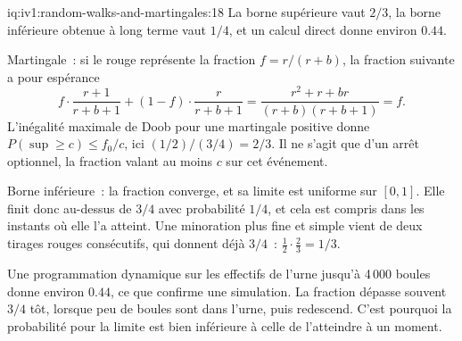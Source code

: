 \begin{solution}{iq:iv1:random-walks-and-martingales:18}
La borne supérieure vaut $2/3$, la borne inférieure obtenue à long terme vaut $1/4$, et un calcul direct donne environ $0.44$.

\begin{sloppypar}Martingale~: si le rouge représente la fraction $f = r/(r + b)$, la fraction suivante a pour espérance
\[
f \cdot \frac{r + 1}{r + b + 1} + (1 - f) \cdot \frac{r}{r + b + 1} = \frac{r^2 + r + br}{(r + b)(r + b + 1)} = f.
\]
L'inégalité maximale de Doob pour une martingale positive donne $P(\sup \ge c) \le f_0/c$, ici $(1/2)/(3/4) = 2/3$. Il ne s'agit que d'un arrêt optionnel, la fraction valant au moins $c$ sur cet événement.\end{sloppypar}

Borne inférieure~: la fraction converge, et sa limite est uniforme sur $[0, 1]$. Elle finit donc au-dessus de $3/4$ avec probabilité $1/4$, et cela est compris dans les instants où elle l'a atteint. Une minoration plus fine et simple vient de deux tirages rouges consécutifs, qui donnent déjà $3/4$~: $\tfrac12 \cdot \tfrac23 = 1/3$.

Une programmation dynamique sur les effectifs de l'urne jusqu'à 4\,000 boules donne environ $0.44$, ce que confirme une simulation. La fraction dépasse souvent $3/4$ tôt, lorsque peu de boules sont dans l'urne, puis redescend. C'est pourquoi la probabilité pour la limite est bien inférieure à celle de l'atteindre à un moment.

\end{solution}

